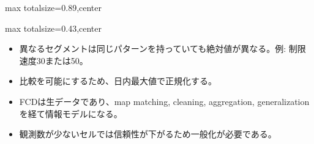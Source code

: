 \begin{minipage}[t]{0.58\textwidth}
\begin{adjustbox}{max totalsize={\textwidth}{0.89\textheight},center}
\begin{minipage}{\textwidth}
\end{minipage}
\end{adjustbox}
\end{minipage}


\clearpage
{}
\begin{minipage}[t]{0.405\textwidth}
\begin{adjustbox}{max totalsize={\textwidth}{0.43\textheight},center}
\begin{minipage}{\textwidth}\scriptsize
{}\begin{itemize}
\item 異なるセグメントは同じパターンを持っていても絶対値が異なる。例: 制限速度30または50。
\item 比較を可能にするため、日内最大値で正規化する。
\end{itemize}\begin{itemize}
\item FCDは生データであり、map matching, cleaning, aggregation, generalization を経て情報モデルになる。
\item 観測数が少ないセルでは信頼性が下がるため一般化が必要である。
\end{itemize}
\end{minipage}
\end{adjustbox}
\end{minipage}\hfill
